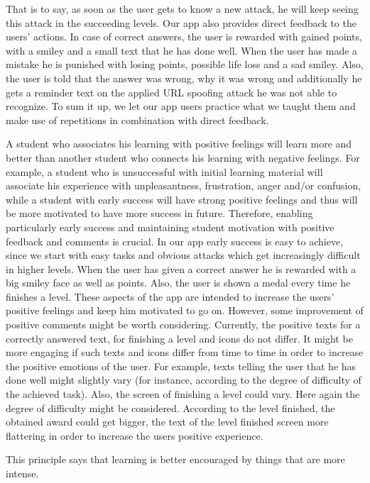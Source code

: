 \begin{description}[leftmargin=0cm]
That is to say, as soon as the user gets to know a new attack, he will keep seeing this attack in the succeeding levels.
Our app also provides direct feedback to the users' actions. 
In case of correct answers, the user is rewarded with gained points, with a smiley and a small text that he has done well.
When the user has made a mistake he is punished with losing points, possible life loss and a sad smiley. Also, the user is told that the answer was wrong, why it was wrong and additionally he gets a reminder text on the applied URL spoofing attack he was not able to recognize.
To sum it up, we let our app users practice what we taught them and make use of repetitions in combination with direct feedback.
	\item[Effect:] A student who associates his learning with positive feelings will learn more and better than another student who connects his learning with negative feelings. 
For example, a student who is unsuccessful with initial learning material will associate his experience with unpleasantness, frustration, anger and/or confusion, while a student with early success will have strong positive feelings and thus will be more motivated to have more success in future.
Therefore, enabling particularly early success and maintaining student motivation with positive feedback and comments is crucial.
In our app early success is easy to achieve, since we start with easy tasks and obvious attacks which get increasingly difficult in higher levels.
When the user has given a correct answer he is rewarded with a big smiley face as well as points. 
Also, the user is shown a medal every time he finishes a level.
These aspects of the app are intended to increase the users' positive feelings and keep him motivated to go on. 
However, some improvement of positive comments might be worth considering.
Currently, the positive texts for a correctly answered text, for finishing a level and icons do not differ. 
It might be more engaging if such texts and icons differ from time to time in order to increase the positive emotions of the user. 
For example, texts telling the user that he has done well might slightly vary (for instance, according to the degree of difficulty of the achieved task).
Also, the screen of finishing a level could vary.
Here again the degree of difficulty might be considered. 
According to the level finished, the obtained award could get bigger, the text of the level finished screen more flattering in order to increase the users positive experience.
	\item[Intensity:] This principle says that learning is better encouraged by things that are more intense. 

\end{description}
